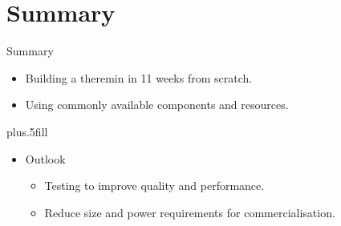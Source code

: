 \documentclass{beamer}
\begin{document}
\section*{Summary}

\begin{frame}{Summary}
	\begin{itemize}
		\item Building a \alert{theremin} in 11 weeks from scratch.
		\item Using \alert{commonly available} components and resources.
	\end{itemize}
	\vskip0pt plus.5fill
	\begin{itemize}
		\item Outlook
		\begin{itemize}
			\item Testing to improve quality and performance.
			\item Reduce size and power requirements for commercialisation.
		\end{itemize}
	\end{itemize}
\end{frame}
\end{document}
